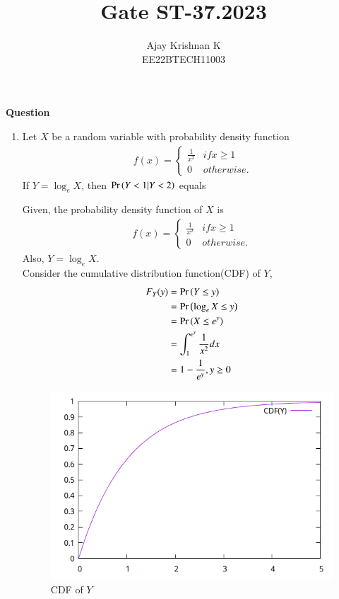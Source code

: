 \documentclass[journal,11pt]{IEEEtran}
\begin{document}
\vspace{3cm}
\author{Ajay Krishnan K\\EE22BTECH11003}

\title{Gate ST-37.2023}
\maketitle

\textbf{Question}
\begin{enumerate}
\item Let $X$ be a random variable with probability density function
\begin{align}\
    f(x) = \begin{cases}
               \frac{1}{x^2} & if x \geq 1 \\
               0             & otherwise.
           \end{cases}
\end{align}
If $Y = \log_e X$, then $\Pr\left(Y<1 | Y<2 \right)$ equals


\solution
Given, the probability density function of $X$ is
\begin{align}
    f(x) = \begin{cases}
               \frac{1}{x^2} & if x \geq 1 \\
               0             & otherwise.
           \end{cases}
\end{align}
Also, $Y = \log_e X$.\\
Consider the cumulative distribution function(CDF) of $Y$,
\begin{align}
    F_Y(y) & = \Pr\left(Y \leq y\right)                   \\
           & = \Pr\left(\log_e X \leq y\right)            \\
           & = \Pr\left(X \leq e^y\right)                 \\
           & = \int_{1}^{e^y} \frac{1}{x^2} dx \\
           & = 1 - \frac{1}{e^y} , y \geq 0
\end{align}
\begin{figure}[!ht]
    \centering
    \includegraphics[width=\columnwidth]{./figs/cdf_plot.png}
    \caption{CDF of $Y$}
    \label{fig:cdf_plot}
\end{figure}



\end{enumerate}
\end{document}

